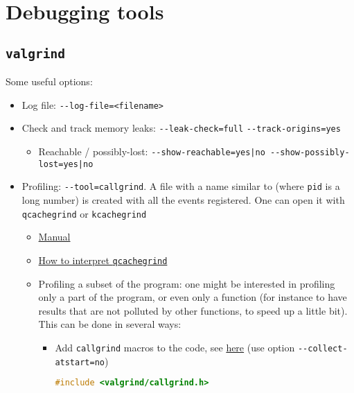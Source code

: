 \documentclass[a4paper,12pt,%
              final%
              ]{article}
\begin{document}
\section{Debugging tools}
\subsection{\texttt{valgrind}}
Some useful options:
\begin{itemize}
  \item Log file: \verb|--log-file=<filename>|
  \item Check and track memory leaks: \verb|--leak-check=full| \verb|--track-origins=yes|
    \begin{itemize}
      \item Reachable / possibly-lost: \verb!--show-reachable=yes|no --show-possibly-lost=yes|no!
    \end{itemize}
  \item Profiling: \verb|--tool=callgrind|. A file with a name similar to  (where \texttt{pid} is a long number) is created with all the events registered. One can open it with \texttt{qcachegrind} or \texttt{kcachegrind}
    \begin{itemize}
      \item \href{https://www.cs.cmu.edu/afs/cs.cmu.edu/project/cmt-40/Nice/RuleRefinement/bin/valgrind-3.2.0/docs/html/cl-manual.html}{Manual}
      \item \href{https://stackoverflow.com/a/50781312/12152457}{How to interpret \texttt{qcachegrind}}
      \item Profiling a subset of the program: one might be interested in profiling only a part of the program, or even only a function (for instance to have results that are not polluted by other functions, to speed up a little bit). This can be done in several ways:
        \begin{itemize}
          \item Add \texttt{callgrind} macros to the code, see \href{https://cta-redmine.irap.omp.eu/projects/gammalib/wiki/How_to_use_valgrind}{here} (use option \verb|--collect-atstart=no|)
\begin{lstlisting}[language=c]
#include <valgrind/callgrind.h>


\end{lstlisting}
\end{itemize}
\end{itemize}
\end{itemize}
\end{document}
